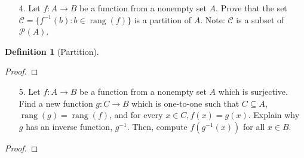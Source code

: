 \documentclass[10pt]{article}
\theoremstyle{definition}
\newtheorem{definition}[equation]{Definition}
\theoremstyle{plain}
\DeclareMathOperator\rang{rang}
\begin{document}
\pagebreak



\begin{enumerate}
\item[4.] Let $f:A \to B$ be a function from a nonempty set $A$.  Prove that the set $ \mathcal{C} = \{f^{-1}(b): b \in \rang(f)\}$ is a partition of $A$.  Note:  $\mathcal{C}$ is a subset of $\mathscr{P}(A)$.
\end{enumerate}



\setcounter{equation}{0}
\begin{definition}[Partition]

\end{definition}

\begin{proof}

\end{proof}



\pagebreak



\begin{enumerate}
\item[5.] Let $f:A \to B$ be a function from a nonempty set $A$ which is surjective.  Find a new function $g:C \to B$ which is one-to-one such that $C \subseteq A$, $\rang(g) = \rang(f)$, and for every $x \in C, f(x) = g(x)$.  Explain why $g$ has an inverse function, $g^{-1}$.  Then, compute $f(g^{-1}(x))$ for all $x \in B$.
\end{enumerate}



\begin{proof}

\end{proof}
\end{document}
